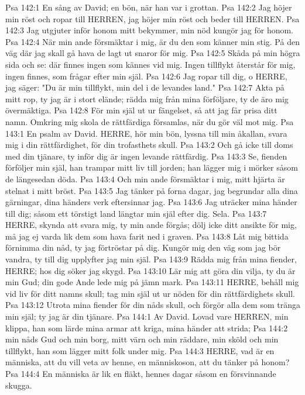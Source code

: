 Psa 142:1  En sång av David; en bön, när han var i grottan.
Psa 142:2  Jag höjer min röst och ropar till HERREN, jag höjer min röst och beder till HERREN.
Psa 142:3  Jag utgjuter inför honom mitt bekymmer, min nöd kungör jag för honom.
Psa 142:4  När min ande försmäktar i mig, är du den som känner min stig. På den väg där jag skall gå hava de lagt ut snaror för mig.
Psa 142:5  Skåda på min högra sida och se: där finnes ingen som kännes vid mig. Ingen tillflykt återstår för mig, ingen finnes, som frågar efter min själ.
Psa 142:6  Jag ropar till dig, o HERRE, jag säger: "Du är min tillflykt, min del i de levandes land."
Psa 142:7  Akta på mitt rop, ty jag är i stort elände; rädda mig från mina förföljare, ty de äro mig övermäktiga.
Psa 142:8  För min själ ut ur fängelset, så att jag får prisa ditt namn. Omkring mig skola de rättfärdiga församlas, när du gör väl mot mig.
Psa 143:1  En psalm av David. HERRE, hör min bön, lyssna till min åkallan, svara mig i din rättfärdighet, för din trofasthets skull.
Psa 143:2  Och gå icke till doms med din tjänare, ty inför dig är ingen levande rättfärdig.
Psa 143:3  Se, fienden förföljer min själ, han trampar mitt liv till jorden; han lägger mig i mörker såsom de längesedan döda.
Psa 143:4  Och min ande försmäktar i mig, mitt hjärta är stelnat i mitt bröst.
Psa 143:5  Jag tänker på forna dagar, jag begrundar alla dina gärningar, dina händers verk eftersinnar jag.
Psa 143:6  Jag uträcker mina händer till dig; såsom ett törstigt land längtar min själ efter dig. Sela.
Psa 143:7  HERRE, skynda att svara mig, ty min ande förgås; dölj icke ditt ansikte för mig, må jag ej varda lik dem som hava farit ned i graven.
Psa 143:8  Låt mig bittida förnimma din nåd, ty jag förtröstar på dig. Kungör mig den väg som jag bör vandra, ty till dig upplyfter jag min själ.
Psa 143:9  Rädda mig från mina fiender, HERRE; hos dig söker jag skygd.
Psa 143:10  Lär mig att göra din vilja, ty du är min Gud; din gode Ande lede mig på jämn mark.
Psa 143:11  HERRE, behåll mig vid liv för ditt namns skull; tag min själ ut ur nöden för din rättfärdighets skull.
Psa 143:12  Utrota mina fiender för din nåds skull, och förgör alla dem som tränga min själ; ty jag är din tjänare.
Psa 144:1  Av David. Lovad vare HERREN, min klippa, han som lärde mina armar att kriga, mina händer att strida;
Psa 144:2  min nåds Gud och min borg, mitt värn och min räddare, min sköld och min tillflykt, han som lägger mitt folk under mig.
Psa 144:3  HERRE, vad är en människa, att du vill veta av henne, en människoson, att du tänker på honom?
Psa 144:4  En människa är lik en fläkt, hennes dagar såsom en försvinnande skugga.
